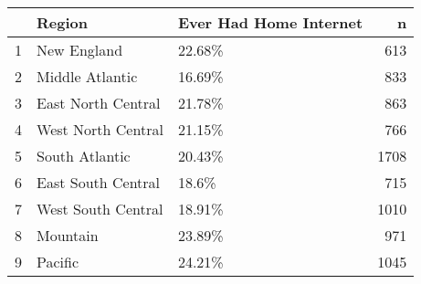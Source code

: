 \begin{table}[ht]
\centering
\begin{tabular}{rllr}
  \hline
 & Region & Ever Had Home Internet & n \\ 
  \hline
1 & New England & 22.68\% & 613 \\ 
  2 & Middle Atlantic & 16.69\% & 833 \\ 
  3 & East North Central & 21.78\% & 863 \\ 
  4 & West North Central & 21.15\% & 766 \\ 
  5 & South Atlantic & 20.43\% & 1708 \\ 
  6 & East South Central & 18.6\% & 715 \\ 
  7 & West South Central & 18.91\% & 1010 \\ 
  8 & Mountain & 23.89\% & 971 \\ 
  9 & Pacific & 24.21\% & 1045 \\ 
   \hline
\end{tabular}
\end{table}
